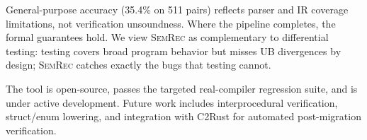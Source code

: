 \documentclass[10pt,a4paper]{article}
\begin{document}
General-purpose accuracy (35.4\% on 511 pairs) reflects parser and IR
coverage limitations, not verification unsoundness.  Where the
pipeline completes, the formal guarantees hold.  We view
\textsc{SemRec} as complementary to differential testing: testing
covers broad program behavior but misses UB divergences by design;
\textsc{SemRec} catches exactly the bugs that testing cannot.

The tool is open-source, passes the targeted real-compiler regression suite, and is under active
development.  Future work includes interprocedural verification,
struct/enum lowering, and integration with C2Rust for automated
post-migration verification.



\end{document}
